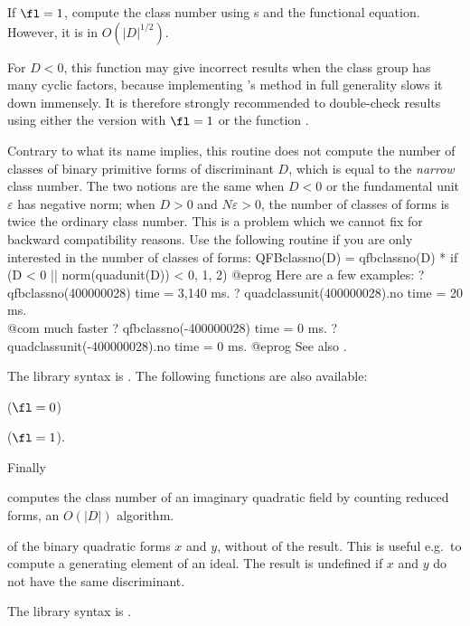 If $\fl=1$, compute the class number using s and the
functional equation. However, it is in $O(|D|^{1/2})$.

 For $D < 0$, this function may give incorrect
results when the class group has many cyclic factors,
because implementing 's method in full generality slows it down
immensely. It is therefore strongly recommended to double-check results using
either the version with $\fl = 1$ or the function .

 Contrary to what its name implies, this routine does not
compute the number of classes of binary primitive forms of discriminant $D$,
which is equal to the \emph{narrow} class number. The two notions are the same
when $D < 0$ or the fundamental unit $\varepsilon$ has negative norm; when $D
> 0$ and $N\varepsilon > 0$, the number of classes of forms is twice the
ordinary class number. This is a problem which we cannot fix for backward
compatibility reasons. Use the following routine if you are only interested
in the number of classes of forms:
\bprog
QFBclassno(D) =
qfbclassno(D) * if (D < 0 || norm(quadunit(D)) < 0, 1, 2)
@eprog\noindent
Here are a few examples:
\bprog
? qfbclassno(400000028)
time = 3,140 ms.
? quadclassunit(400000028).no
time = 20 ms. \\@com{ much faster}
? qfbclassno(-400000028)
time = 0 ms.
? quadclassunit(-400000028).no
time = 0 ms.
@eprog\noindent
See also .

The library syntax is .
The following functions are also available:

 ($\fl = 0$)

 ($\fl = 1$).

\noindent Finally

 computes the class number of an imaginary
quadratic field by counting reduced forms, an $O(|D|)$ algorithm.

\label{se:qfbcompraw}
 of the binary quadratic forms $x$ and $y$, without
 of the result. This is useful e.g.~to compute a generating
element of an ideal. The result is undefined if $x$ and $y$ do not have the
same discriminant.

The library syntax is .

